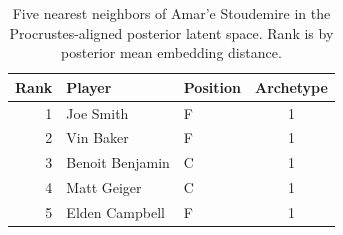 \begin{table}[htbp]
  \centering\small
  \begin{tabular}{rllc}
    \toprule
    Rank & Player & Position & Archetype \\
    \midrule
    1 & Joe Smith & F & 1 \\
    2 & Vin Baker & F & 1 \\
    3 & Benoit Benjamin & C & 1 \\
    4 & Matt Geiger & C & 1 \\
    5 & Elden Campbell & F & 1 \\
    \bottomrule
  \end{tabular}
  \caption{Five nearest neighbors of Amar'e Stoudemire in the Procrustes-aligned posterior latent space. Rank is by posterior mean embedding distance.}
  \label{tab:Amar_e_Stoudemire_neighbors}
\end{table}

